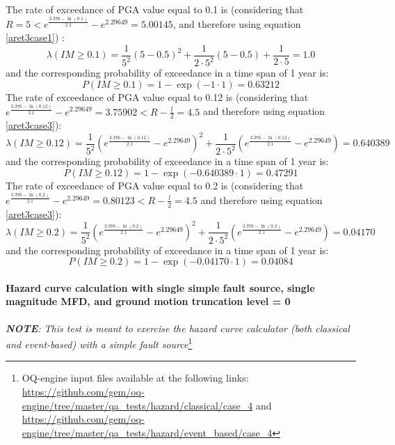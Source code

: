 The rate of exceedance of PGA value equal to 0.1 is (considering that  $R = 5 <
e^{\frac{3.376 - \ln(0.1)}{2.1}} - e^{2.29649} = 5.00145$, and therefore using
equation \ref{aret3case1}) :
\begin{equation}
\lambda(IM \geq 0.1) = \frac{1}{5^{2}}(5 - 0.5)^{2} + \frac{1}{2\cdot5^{2}}(5 - 0.5) + \frac{1}{2\cdot5} = 1.0
\end{equation}
and the corresponding probability of exceedance in a time span of 1 year is:
\begin{equation}
P(IM \geq 0.1) = 1 - \exp(-1 \cdot 1) = 0.63212
\end{equation}
The rate of exceedance of PGA value equal to 0.12 is (considering that
$e^{\frac{3.376 - \ln(0.12)}{2.1}} - e^{2.29649} = 3.75902 < R - \frac{l}{2} = 4.5$ and therefore using equation \ref{aret3case3}):
\begin{equation}
\lambda(IM \geq 0.12) = \frac{1}{5^{2}} (e^{\frac{3.376 - \ln(0.12)}{2.1}} -
e^{2.29649})^{2} + \frac{1}{2\cdot 5^{2}}(e^{\frac{3.376 - \ln(0.12)}{2.1}} - e^{2.29649}) = 0.640389
\end{equation}
and the corresponding probability of exceedance in a time span of 1 year is:
\begin{equation}
P(IM \geq 0.12) = 1 - \exp(-0.640389 \cdot 1) = 0.47291
\end{equation}
The rate of exceedance of PGA value equal to 0.2 is (considering that
$e^{\frac{3.376 - \ln(0.2)}{2.1}} - e^{2.29649} = 0.80123 < R - \frac{l}{2} = 4.5$ and therefore using equation \ref{aret3case3}):
\begin{equation}
\lambda(IM \geq 0.2) = \frac{1}{5^{2}} (e^{\frac{3.376 - \ln(0.2)}{2.1}} -
e^{2.29649})^{2} + \frac{1}{2\cdot 5^{2}}(e^{\frac{3.376 - \ln(0.2)}{2.1}} - e^{2.29649}) = 0.04170
\end{equation}
and the corresponding probability of exceedance in a time span of 1 year is:
\begin{equation}
P(IM \geq 0.2) = 1 - \exp(-0.04170 \cdot 1) = 0.04084
\end{equation}
%
\clearpage
%
\paragraph{Hazard curve calculation with single simple
fault source, single magnitude MFD, and ground motion truncation level = 0} 
\textit{\textbf{NOTE}:
This test is meant to exercise the hazard curve calculator (both classical and
event-based) with a simple fault source}\footnote{
    OQ-engine input files available at the following links:
    \url{https://github.com/gem/oq-engine/tree/master/qa_tests/hazard/classical/case_4}
    and 
    \url{https://github.com/gem/oq-engine/tree/master/qa_tests/hazard/event_based/case_4}}

